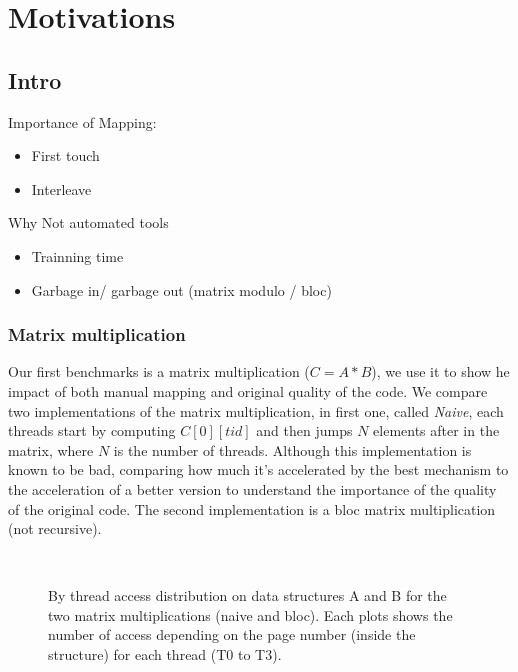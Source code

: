 \section{Motivations}
\label{sec:motivations}

\subsection{Intro}
\label{sec:motivations-intro}

Importance of Mapping:
\begin{itemize}
    \item First touch
    \item Interleave
\end{itemize}

Why Not automated tools
\begin{itemize}
    \item Trainning time
    \item Garbage in/ garbage out (matrix modulo / bloc)
\end{itemize}
\subsubsection{Matrix multiplication}


Our first benchmarks is a matrix multiplication ($C=A*B$), we use it to show he
impact of both manual mapping and original quality of the code. We compare two
implementations of the matrix multiplication, in first one, called
\emph{Naive}, each threads start by computing $C[0][tid]$ and then jumps $N$
elements after in the matrix, where $N$ is the number of threads. Although
this implementation is known to be bad, comparing how much it's accelerated by
the best mechanism to the acceleration of a better version to understand the
importance of the quality of the original code.  The
second implementation is a bloc matrix multiplication (not recursive).

\begin{figure}[htb]
    \centering
    \\
    \caption{By thread access distribution on data structures A and B for the
    two matrix multiplications (naive and bloc). Each plots shows the number of access
depending on the page number (inside the structure) for each thread (T0 to
T3).}
    \label{fig:matrix-behaviour}
\end{figure}

